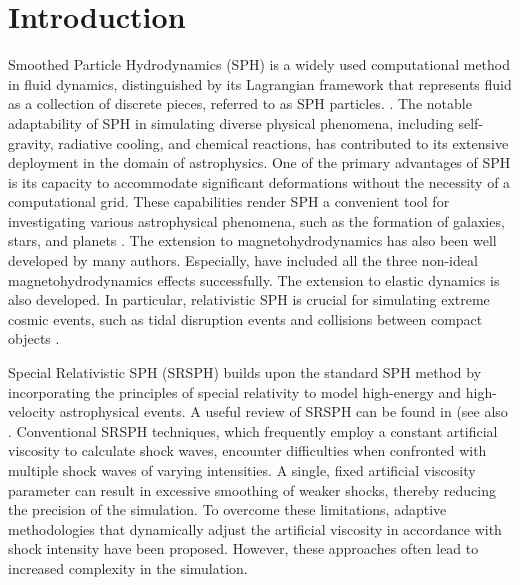 \documentclass[]{aastex631}
\begin{document}
\section{Introduction}
\label{sec:intro}
Smoothed Particle Hydrodynamics (SPH) is a widely used computational method in fluid dynamics, distinguished by its Lagrangian framework that represents fluid as a collection of discrete pieces, referred to as SPH particles.  \citep[e.g.,][]{Gingold_Monaghan_1977,Lucy_1977}.
The notable adaptability of SPH in simulating diverse physical phenomena, including self-gravity, radiative cooling, and chemical reactions, has contributed to its extensive deployment in the domain of astrophysics. 
One of the primary advantages of SPH is its capacity to accommodate significant deformations without the necessity of a computational grid. 
These capabilities render SPH a convenient tool for investigating various astrophysical phenomena, such as the formation of galaxies, stars, and planets \citep[e.g.,][]{Springnel_2010,Monaghan_2012}.
The extension to magnetohydrodynamics has also been well developed by many authors\citep[e.g.,][]{Iwasaki_Inutsuka_2011,Price_2012,Tsukamoto_etal_2013}.
Especially, \citet{Tsukamoto_etal_2017,Tsukamoto_etal_2021} have included all the three non-ideal magnetohydrodynamics effects successfully. 
The extension to elastic dynamics is also developed\citep{Sugiura_Inutsuka_2017}. 
In particular, relativistic SPH is crucial for simulating extreme cosmic events, such as tidal disruption events and collisions between compact objects \citep[e.g.,][]{Rosswog+_2008,Rosswog_2013}.


Special Relativistic SPH (SRSPH) builds upon the standard SPH method by incorporating the principles of special relativity to model high-energy and high-velocity astrophysical events.
A useful review of SRSPH can be found in \citep{Rosswog_2015} (see also \citep[e.g.,][]{Chow_Monaghan_1997,Rosswog_2010}.
Conventional SRSPH techniques, which frequently employ a constant artificial viscosity to calculate shock waves, encounter difficulties when confronted with multiple shock waves of varying intensities. A single, fixed artificial viscosity parameter can result in excessive smoothing of weaker shocks, thereby reducing the precision of the simulation. To overcome these limitations, adaptive methodologies that dynamically adjust the artificial viscosity in accordance with shock intensity have been proposed. However, these approaches often lead to increased complexity in the simulation.
\end{document}
